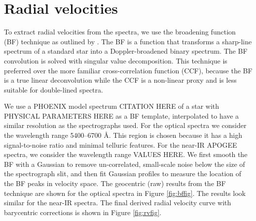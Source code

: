 \section{Radial velocities}\label{rvs}
To extract radial velocities from the spectra, we use the broadening function (BF) technique as outlined by \citet{ruc02}. The BF is a function that transforms a sharp-line spectrum of a standard star into a Doppler-broadened binary spectrum. The BF convolution is solved with singular value decomposition. This technique is preferred over the more familiar cross-correlation function (CCF), because the BF is a true linear deconvolution while the CCF is a non-linear proxy and is less suitable for double-lined spectra.

We use a PHOENIX model spectrum CITATION HERE of a star with PHYSICAL PARAMETERS HERE as a BF template, interpolated to have a similar resolution as the spectrographs used. For the optical spectra we consider the wavelength range 5400--6700 \AA. This region is chosen because it has a high signal-to-noise ratio and minimal telluric features. For the near-IR APOGEE spectra, we consider the wavelength range VALUES HERE. We first smooth the BF with a Gaussian to remove un-correlated, small-scale noise below the size of the spectrograph slit, and then fit Gaussian profiles to measure the location of the BF peaks in velocity space. The geocentric (raw) results from the BF technique are shown for the optical spectra in Figure \ref{fig:bffig}. The results look similar for the near-IR spectra. The final derived radial velocity curve with barycentric corrections is shown in Figure \ref{fig:rvfig}.
